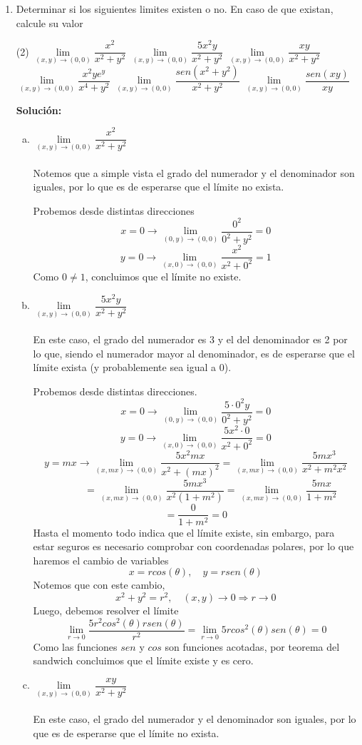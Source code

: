 \documentclass[12pt]{article}
\newenvironment{solucion}
{\begin{mdframed}[backgroundcolor=black!10]
		{\bf Solución:}\\
	}
	{
	\end{mdframed}
}
\newenvironment{preguntas}
{\begin{enumerate}\itemsep12pt
	}
	{
	\end{enumerate}
}
\newcommand{\ra}{\rightarrow}
\begin{document}
\begin{preguntas}
\item Determinar si los siguientes limites existen o no. En caso de que existan, calcule su valor
\begin{tasks}(2)
\task $\lim\limits_{(x,y) \to (0,0)} \dfrac{x^2}{x^2+y^2}$
\task $\lim\limits_{(x,y) \to (0,0)} \dfrac{5x^2y}{x^2+y^2}$
\task $\lim\limits_{(x,y) \to (0,0)} \dfrac{xy}{x^2+y^2}$
\task $\lim\limits_{(x,y) \to (0,0)} \dfrac{x^2ye^y}{x^4+y^2}$
\task $\lim\limits_{(x,y) \to (0,0)} \dfrac{sen(x^2+y^2)}{x^2+y^2}$
\task $\lim\limits_{(x,y) \to (0,0)} \dfrac{sen(xy)}{xy}$
\end{tasks}
\begin{solucion}

\begin{enumerate}[a)]
\item $\lim\limits_{(x,y) \to (0,0)} \dfrac{x^2}{x^2+y^2}$\\
			\\
			Notemos que a simple vista el grado del numerador y el denominador son iguales, por lo que es de esperarse que el límite no exista.
			
			Probemos desde distintas direcciones
			$$x = 0 \ra \lim\limits_{(0,y) \to (0,0)} \dfrac{0^2}{0^2+y^2}
			= 0$$
			$$y = 0 \ra \lim\limits_{(x,0) \to (0,0)} \dfrac{x^2}{x^2+0^2}
			= 1$$
			Como $0 \neq 1$, concluimos que el límite no existe.
\item $\lim\limits_{(x,y) \to (0,0)} \dfrac{5x^2y}{x^2+y^2}$\\
			\\
			En este caso, el grado del numerador es 3 y el del denominador es 2 por lo que, siendo el numerador mayor al denominador, es de esperarse que el límite exista (y probablemente sea igual a 0).
			
			Probemos desde distintas direcciones.
			$$x = 0 \ra \lim\limits_{(0,y) \to (0,0)} \dfrac{5\cdot0^2y}{0^2+y^2} = 0$$
			$$y = 0 \ra \lim\limits_{(x,0) \to (0,0)} \dfrac{5x^2\cdot 0}{x^2+0^2} = 0$$
			$$y = mx \ra \lim\limits_{(x,mx) \to (0,0)} \dfrac{5x^2 mx}{x^2+(mx)^2}
			= \lim\limits_{(x,mx) \to (0,0)} \dfrac{5mx^3}{x^2+m^2x^2}$$
			$$\qquad \quad = \lim\limits_{(x,mx) \to (0,0)} \dfrac{5mx^3}{x^2(1+m^2)}
			= \lim\limits_{(x,mx) \to (0,0)} \dfrac{5mx}{1+m^2}$$
			$$= \dfrac{0}{1+m^2} = 0$$
			Hasta el momento todo indica que el límite existe, sin embargo, para estar seguros es necesario comprobar con coordenadas polares, por lo que haremos el cambio de variables
			$$x = rcos(\theta), \quad y = rsen(\theta)$$
			Notemos que con este cambio,
			$$x^2+y^2 = r^2, \quad (x,y)\ra 0 \Longrightarrow r \ra 0$$
			Luego, debemos resolver el límite
			$$\lim\limits_{r\ra 0} \dfrac{5r^2cos^2(\theta)rsen(\theta)}{r^2}
			= \lim\limits_{r\ra 0} 5rcos^2(\theta)sen(\theta) = 0$$
			Como las funciones $sen$ y $cos$ son funciones acotadas, por teorema del sandwich concluimos que el límite existe y es cero.
\item $\lim\limits_{(x,y) \to (0,0)} \dfrac{xy}{x^2+y^2}$\\
			\\
			En este caso, el grado del numerador y el denominador son iguales, por lo que es de esperarse que el límite no exista.
			

\end{enumerate}
\end{solucion}
\end{preguntas}
\end{document}
